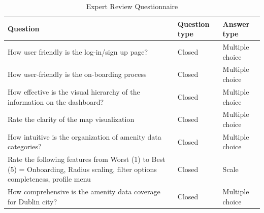 \documentclass{report}
\begin{document}
\begin{table}[h!]
    \centering
    \caption{Expert Review Questionnaire}
    \label{tab:table3}
    \begin{tabularx}{\textwidth}{|p{}|X|X|}
        \hline
        \textbf{Question}                                                                                                                                                                                                                & \textbf{Question type} & \textbf{Answer type} \\ \hline
        How user friendly is the log-in/sign up page?                                                                                                                                                                                    & Closed                 & Multiple choice      \\ \hline
        How user-friendly is the on-boarding process                                                                                                                                                                                     & Closed                 & Multiple choice      \\ \hline
        How effective is the visual hierarchy of the information on the dashboard?                                                                                                                                                       & Closed                 & Multiple choice      \\ \hline
        Rate the clarity of the map visualization                                                                                                                                                                                        & Closed                 & Multiple choice      \\ \hline
        How intuitive is the organization of amenity data categories?                                                                                                                                                                    & Closed                 & Multiple choice      \\ \hline
        Rate the following features from Worst (1) to Best (5) = Onboarding, Radius scaling, filter options completeness, profile menu                                                                                                   & Closed                 & Scale                \\ \hline
        How comprehensive is the amenity data coverage for Dublin city?                                                                                                                                                                  & Closed                 & Multiple choice      \\ \hline

\end{tabularx}
\end{table}
\end{document}
